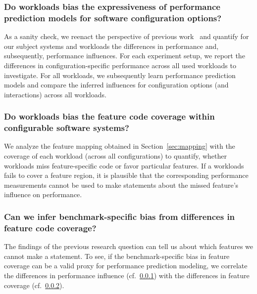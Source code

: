 \documentclass[conference]{IEEEtran}
\begin{document}
\subsubsection{Do workloads bias the expressiveness of performance prediction models for software configuration options?}\label{sec:rq1}
As a sanity check, we reenact the perspective of previous work~\cite{alves_sampling_2020,jamishidi_transfer_2017,jamshidi_learning_2018,jamshidi_transfer_gp_2017} and quantify for our subject systems and workloads the differences in performance and, subsequently, performance influences. For each experiment setup, we report the differences in configuration-specific performance across all used workloads to investigate. For all workloads, we subsequently learn performance prediction models and compare the inferred influences for configuration options (and interactions) across all workloads.

\subsubsection{Do workloads bias the feature code coverage within configurable software systems?}\label{sec:rq2}
We analyze the feature mapping obtained in Section~\ref{sec:mapping} with the coverage of each workload (across all configurations) to quantify, whether workloads miss feature-specific code or favor particular features. If a workloads fails to cover a feature region, it is plausible that the corresponding performance measurements cannot be used to make statements about the missed feature's influence on performance.

\subsubsection{Can we infer benchmark-specific bias from differences in feature code coverage?}\label{sec:rq3}
The findings of the previous research question can tell us about which features we cannot make a statement. To see, if the benchmark-specific bias in feature coverage can be a valid proxy for performance prediction modeling, we correlate the differences in performance influence (cf.~\ref{sec:rq1}) with the differences in feature coverage (cf.~\ref{sec:rq2}).
\end{document}
